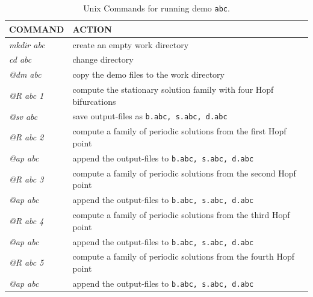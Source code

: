 \documentclass[12pt]{report}
\begin{document}
\begin{table}[htbp]
\begin{center}
\begin{tabular}{| l | l |}
\hline
  COMMAND  & ACTION \\ 
\hline
  {\it mkdir abc} & create an empty work directory \\ 
  {\it cd abc} & change directory \\
  {\it @dm abc} & copy the demo files to the work directory \\
\hline
  {\it @R abc 1} & compute the stationary solution family 
						with four Hopf bifurcations \\ 
  {\it @sv abc} & save output-files as {\tt b.abc, s.abc, d.abc} \\ 
\hline
  {\it @R abc 2} & compute a family of periodic solutions from the first Hopf point \\ 
  {\it @ap abc} & append the output-files to {\tt b.abc, s.abc, d.abc} \\ 
\hline
  {\it @R abc 3} & compute a family of periodic solutions from the second Hopf point \\ 
  {\it @ap abc} & append the output-files to {\tt b.abc, s.abc, d.abc} \\ 
\hline
  {\it @R abc 4} & compute a family of periodic solutions from the third Hopf point \\ 
  {\it @ap abc} & append the output-files to {\tt b.abc, s.abc, d.abc} \\ 
\hline
  {\it @R abc 5} & compute a family of periodic solutions from the fourth Hopf point \\ 
  {\it @ap abc} & append the output-files to {\tt b.abc, s.abc, d.abc} \\ 
\hline
\end{tabular}
\caption{Unix Commands for running demo {\tt abc}.}
\label{tbl:demo_abcL}
\end{center}
\end{table}
\end{document}
